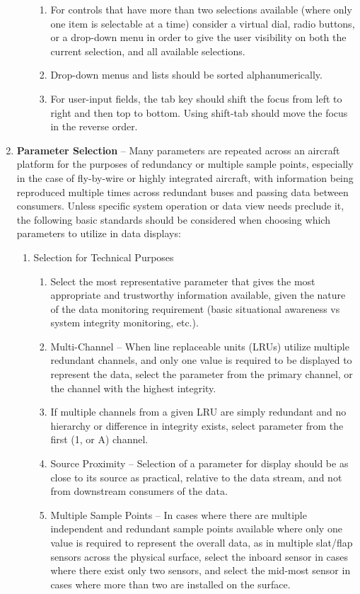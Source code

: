 \documentclass[
]{book}
\providecommand{\tightlist}{%
  \setlength{\itemsep}{0pt}\setlength{\parskip}{0pt}}
\begin{document}
\begin{enumerate}
\begin{enumerate}
\begin{enumerate}
    \item
      For controls that have more than two selections available (where only one item is selectable at a time) consider a virtual dial, radio buttons, or a drop-down menu in order to give the user visibility on both the current selection, and all available selections.
    \item
      Drop-down menus and lists should be sorted alphanumerically.
    \item
      For user-input fields, the tab key should shift the focus from left to right and then top to bottom. Using shift-tab should move the focus in the reverse order.
    \end{enumerate}
  \end{enumerate}
\item
  \textbf{Parameter Selection} -- Many parameters are repeated across an aircraft platform for the purposes of redundancy or multiple sample points, especially in the case of fly-by-wire or highly integrated aircraft, with information being reproduced multiple times across redundant buses and passing data between consumers. Unless specific system operation or data view needs preclude it, the following basic standards should be considered when choosing which parameters to utilize in data displays:

  \begin{enumerate}
  \def\labelenumii{\alph{enumii}.}
  \tightlist
  \item
    Selection for Technical Purposes

    \begin{enumerate}
    \def\labelenumiii{\arabic{enumiii}.}
    \item
      Select the most representative parameter that gives the most appropriate and trustworthy information available, given the nature of the data monitoring requirement (basic situational awareness vs system integrity monitoring, etc.).
    \item
      Multi-Channel -- When line replaceable units (LRUs) utilize multiple redundant channels, and only one value is required to be displayed to represent the data, select the parameter from the primary channel, or the channel with the highest integrity.
    \item
      If multiple channels from a given LRU are simply redundant and no hierarchy or difference in integrity exists, select parameter from the first (1, or A) channel.
    \item
      Source Proximity -- Selection of a parameter for display should be as close to its source as practical, relative to the data stream, and not from downstream consumers of the data.
    \item
      Multiple Sample Points -- In cases where there are multiple independent and redundant sample points available where only one value is required to represent the overall data, as in multiple slat/flap sensors across the physical surface, select the inboard sensor in cases where there exist only two sensors, and select the mid-most sensor in cases where more than two are installed on the surface.


\end{enumerate}
\end{enumerate}
\end{enumerate}
\end{document}
